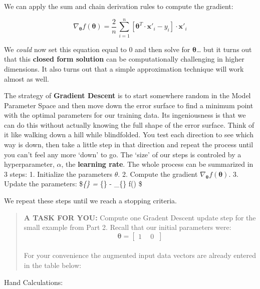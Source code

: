 \documentclass[11pt]{article}
\begin{document}
We can apply the sum and chain derivation rules to compute the gradient:

\begin{equation}\tag{3.1}
\nabla_{\boldsymbol{\theta}} f(\boldsymbol{\theta}) = \frac{2}{n}\,\sum_{i=1}^{n}\left[ \boldsymbol{\theta}^T\cdot\mathbf{x}'_i - y_i\right] \cdot \mathbf{x}'_i
\end{equation}

We \emph{could} now set this equation equal to \(0\) and then solve for
\(\boldsymbol{\theta}\)\ldots{} but it turns out that this
\textbf{closed form solution} can be computationally challenging in
higher dimensions. It also turns out that a simple approximation
technique will work almost as well.

The strategy of \textbf{Gradient Descent} is to start somewhere random
in the Model Parameter Space and then move down the error surface to
find a minimum point with the optimal parameters for our training data.
Its ingeniousness is that we can do this without actually knowing the
full shape of the error surface. Think of it like walking down a hill
while blindfolded. You test each direction to see which way is down,
then take a little step in that direction and repeat the process until
you can't feel any more `down' to go. The `size' of our steps is
controled by a hyperparameter, \(\alpha\), the \textbf{learning rate}.
The whole process can be summarized in 3 steps: 1. Initialize the
parameters \(\theta\). 2. Compute the gradient
\(\nabla_{\boldsymbol{\theta}} f(\boldsymbol{\theta})\). 3. Update the
parameters: \$\theta\emph{\{\} = \theta}\{\} -
\alpha \cdot \nabla\_\{\boldsymbol{\theta}\} f(\boldsymbol{\theta}) \$

We repeat these steps until we reach a stopping criteria.

    \begin{quote}
\textbf{A TASK FOR YOU:} Compute one Gradent Descent update step for the
small example from Part 2. Recall that our initial parameters were:
\[ \boldsymbol{\theta} = \begin{bmatrix} 1 \ \quad 0 \ \end{bmatrix}\]\\
For your convenience the augmented input data vectors are already
entered in the table below:
\end{quote}

Hand Calculations:
\end{document}
